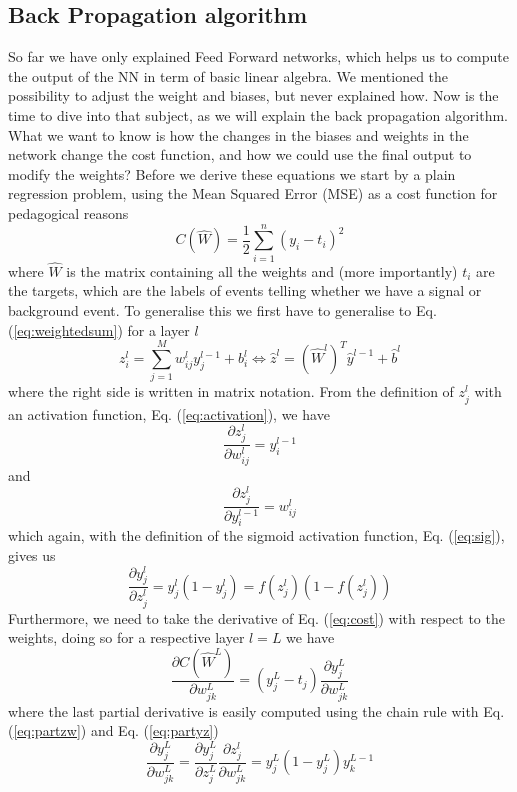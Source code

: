 \documentclass[12pt, a4paper]{book}
\begin{document}
\subsection{Back Propagation algorithm}
So far we have only explained Feed Forward networks, which helps us to compute the output of the NN in term of basic linear algebra. We mentioned the possibility to adjust the weight and biases, but never explained how. 
Now is the time to dive into that subject, as we will explain the back propagation algorithm. What we want to know is how the changes in the biases and weights in the network change the cost function, and how we could use the final 
output to modify the weights? Before we derive these equations we start by a plain regression problem, using the Mean Squared Error (MSE) as a cost function for pedagogical reasons
\begin{equation}\label{eq:cost}
    C(\hat{W})=\frac{1}{2}\sum_{i=1}^n(y_i-t_i)^2
\end{equation}
where $\hat{W}$ is the matrix containing all the weights and (more importantly) $t_i$ are the targets, which are the labels of events telling whether we have a signal or background event. To generalise this we 
first have to generalise to Eq. (\ref{eq:weightedsum}) for a layer $l$
$$
    z_i^l=\sum_{j=1}^Mw^l_{ij}y^{l-1}_j + b^l_i \Leftrightarrow \hat{z}^l=\left(\hat{W}^l\right)^T\hat{y}^{l-1} + \hat{b}^l
$$
where the right side is written in matrix notation. From the definition of $z_j^l$ with an activation function, Eq. (\ref{eq:activation}), we have
\begin{equation}\label{eq:partzw}
    \frac{\partial z_j^l}{\partial w_{ij}^l} = y_i^{l-1}
\end{equation}
and
$$
\frac{\partial z_j^l}{\partial y_i^{l-1}} = w_{ij}^l
$$
which again, with the definition of the sigmoid activation function, Eq. (\ref{eq:sig}), gives us
\begin{equation}\label{eq:partyz}
    \frac{\partial y^l_j}{\partial z_j^{l}} = y_j^l(1-y_j^l)=f(z_j^l)(1-f(z_j^l))
\end{equation}
Furthermore, we need to take the derivative of Eq. (\ref{eq:cost}) with respect to the weights, doing so for a respective layer $l=L$ we have
$$
    \frac{\partial C(\hat W ^L) }{\partial w_{jk}^L}=\left(y_j^L-t_j\right)\frac{\partial y_j^L}{\partial w_{jk}^L}
$$
where the last partial derivative is easily computed using the chain rule with Eq. (\ref{eq:partzw}) and Eq. (\ref{eq:partyz})
$$
\frac{\partial y_j^L}{\partial w_{jk}^L} = \frac{\partial y^L_j}{\partial z_j^{L}}\frac{\partial z_j^l}{\partial w_{jk}^L} = y_j^L(1-y_j^L)y_k^{L-1}
$$
\end{document}
